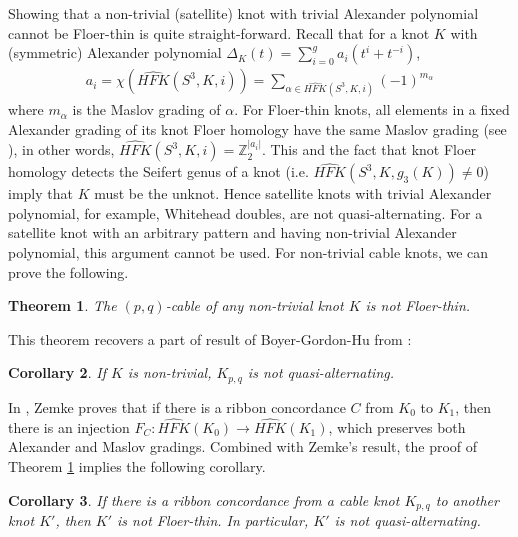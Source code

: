 \documentclass[11pt,reqno]{amsart}
\newtheorem {theorem}{Theorem}
\newtheorem {corollary}[theorem]{Corollary}
\theoremstyle{definition}
\newtheorem *{remark}{Remark}
\newcommand{\hfkhat}{\widehat{\mathit{HFK}}}
\begin{document}
 

 Showing that a non-trivial (satellite) knot with trivial Alexander polynomial cannot be Floer-thin is quite straight-forward. Recall that for a knot $K$ with (symmetric) Alexander polynomial $\Delta_K(t) = \sum_{i=0}^{g} a_i (t^i + t^{-i})$,
\begin{gather*}
 a_i = \chi(\hfkhat(S^3,K,i))  = \sum_{\alpha \in \hfkhat(S^3,K,i)} (-1)^{m_\alpha}  
\end{gather*}
where $m_{\alpha}$ is the Maslov grading of $\alpha$. For Floer-thin knots, all elements in a fixed Alexander grading of its knot Floer homology have the same Maslov grading (see \cite[Theorem 1.2]{mo07}), in other words, $\hfkhat(S^3,K,i) = \mathbb{Z}_2^{|a_i|}$. This and the fact that knot Floer homology detects the Seifert genus of a knot (i.e. $\hfkhat(S^3,K,g_3(K))\not= 0$) imply that $K$ must be the unknot. Hence satellite knots with trivial Alexander polynomial, for example, Whitehead doubles, are not quasi-alternating. For a satellite knot with an arbitrary pattern and having non-trivial Alexander polynomial, this argument cannot be used. For non-trivial cable knots, we can prove the following.
\begin{theorem}
\label{thm:main} The $(p,q)$-cable of any non-trivial knot $K$ is not Floer-thin.

\end{theorem}
This theorem recovers a part of result of Boyer-Gordon-Hu from \cite{bgh21}:
\begin{corollary}
If $K$ is non-trivial, $K_{p,q}$ is not quasi-alternating. 
\end{corollary}

In \cite[Theorem 1.1]{zemke19}, Zemke proves that if there is a ribbon concordance $C$ from $K_0$ to $K_1$, then there is an injection $F_C : \widehat{HFK}(K_0) \rightarrow \widehat{HFK}(K_1)$, which preserves both Alexander and Maslov gradings. Combined with Zemke's result, the proof of Theorem \ref{thm:main} implies the following corollary.

\begin{corollary}
\label{morethin}
If there is a ribbon concordance from a cable knot $K_{p,q}$ to another knot $K'$, then $K'$ is not Floer-thin. In particular, $K'$ is not quasi-alternating.  

\end{corollary}
\end{document}
